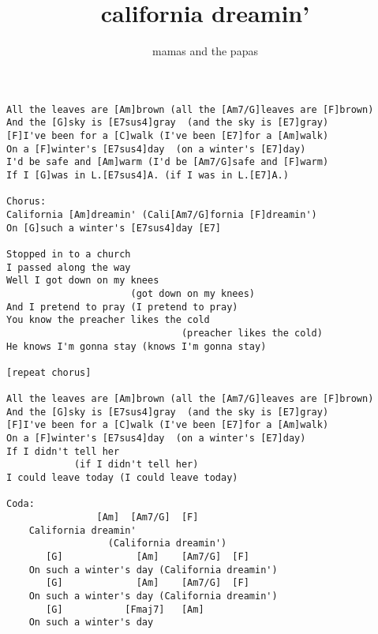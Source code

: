 \author{mamas and the papas}
\title{california dreamin'}
\maketitle
\begin{verbatim}   
All the leaves are [Am]brown (all the [Am7/G]leaves are [F]brown)
And the [G]sky is [E7sus4]gray  (and the sky is [E7]gray)
[F]I've been for a [C]walk (I've been [E7]for a [Am]walk)
On a [F]winter's [E7sus4]day  (on a winter's [E7]day)
I'd be safe and [Am]warm (I'd be [Am7/G]safe and [F]warm)
If I [G]was in L.[E7sus4]A. (if I was in L.[E7]A.)

Chorus:
California [Am]dreamin' (Cali[Am7/G]fornia [F]dreamin')
On [G]such a winter's [E7sus4]day [E7]

Stopped in to a church
I passed along the way
Well I got down on my knees
                      (got down on my knees)
And I pretend to pray (I pretend to pray)
You know the preacher likes the cold
                               (preacher likes the cold)
He knows I'm gonna stay (knows I'm gonna stay)

[repeat chorus]

All the leaves are [Am]brown (all the [Am7/G]leaves are [F]brown)
And the [G]sky is [E7sus4]gray  (and the sky is [E7]gray)
[F]I've been for a [C]walk (I've been [E7]for a [Am]walk)
On a [F]winter's [E7sus4]day  (on a winter's [E7]day)
If I didn't tell her
            (if I didn't tell her)
I could leave today (I could leave today)

Coda:
	            [Am]  [Am7/G]  [F]
	California dreamin'
	              (California dreamin')
	   [G]             [Am]    [Am7/G]  [F]
	On such a winter's day (California dreamin')
	   [G]             [Am]    [Am7/G]  [F]
	On such a winter's day (California dreamin')
	   [G]           [Fmaj7]   [Am]
	On such a winter's day
\end{verbatim}
